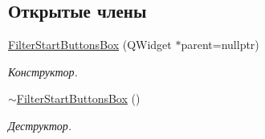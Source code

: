 \subsection*{Открытые члены}
\begin{DoxyCompactItemize}
\item 
\hyperlink{class_filter_start_buttons_box_a7e21c8886cd0f711a756b4a1f04c0989}{Filter\+Start\+Buttons\+Box} (Q\+Widget $\ast$parent=nullptr)\hypertarget{class_filter_start_buttons_box_a7e21c8886cd0f711a756b4a1f04c0989}{}\label{class_filter_start_buttons_box_a7e21c8886cd0f711a756b4a1f04c0989}

\begin{DoxyCompactList}\small\item\em Конструктор. \end{DoxyCompactList}\item 
\hyperlink{class_filter_start_buttons_box_a26579dc4b7375d2fc37c0693a4684057}{$\sim$\+Filter\+Start\+Buttons\+Box} ()\hypertarget{class_filter_start_buttons_box_a26579dc4b7375d2fc37c0693a4684057}{}\label{class_filter_start_buttons_box_a26579dc4b7375d2fc37c0693a4684057}

\begin{DoxyCompactList}\small\item\em Деструктор. \end{DoxyCompactList}\end{DoxyCompactItemize}
